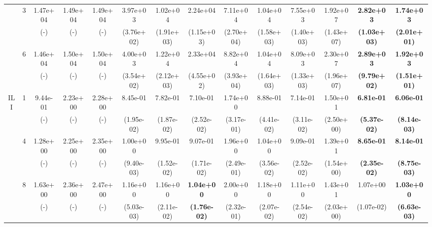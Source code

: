 \begin{table}[!t]
{\begin{tabular}{cccccccccccccc}
        \cmidrule(l){3-14}
         & \multirow{2}{*}{3}& 1.47e+04& 1.49e+04 & 1.49e+04 & 3.97e+03 & 1.02e+04& 2.24e+04& 7.11e+04 & 1.04e+04 & 7.55e+03& 1.92e+07 & \textbf{2.82e+03} & \textbf{1.74e+03}\s \\ 
         &  & (-)& (-) & (-) & (3.76e+02) & (1.91e+03)   & (1.15e+03)          & (2.70e+04) & (1.58e+03) & (1.40e+03) & (1.43e+07) & \textbf{(1.03e+03)} & \textbf{(2.01e+01)} \\
         \cmidrule(l){3-14}
         & \multirow{2}{*}{6}& 1.46e+04& 1.50e+04 & 1.50e+04 & 4.00e+03 & 1.22e+04& 2.33e+04& 8.82e+04 & 1.04e+04 & 8.09e+03& 2.30e+07 & \textbf{2.89e+03} & \textbf{1.92e+03}\s \\ 
         &  & (-)& (-) & (-) & (3.54e+02) & (2.12e+03)   & (4.55e+02)          & (3.93e+04) & (1.64e+03) & (1.33e+03) & (1.96e+07) & \textbf{(9.79e+02)} & \textbf{(1.51e+01)} \\
         \cmidrule(l){2-14}
        \multirow{6}{*}{ILI} & 1& 9.44e-01& 2.23e+00 & 2.28e+00 & 8.45e-01 & 7.82e-01& 7.10e-01& 1.74e+00 & 8.88e-01 & 7.14e-01& 1.50e+01 & \textbf{6.81e-01} & \textbf{6.06e-01}\s \\ 
        &  & (-)& (-) & (-) & (1.95e-02) & (1.87e-02)   & (2.52e-02)          & (3.17e-01) & (4.41e-02) & (3.11e-02) & (2.50e+00) & \textbf{(5.37e-02)} & \textbf{(8.14e-03)} \\
        \cmidrule(l){3-14}
         & \multirow{2}{*}{4}& 1.28e+00& 2.25e+00 & 2.35e+00 & 1.00e+00 & 9.95e-01& 9.07e-01& 1.96e+00 & 1.04e+00 & 9.09e-01& 1.39e+01 & \textbf{8.65e-01} & \textbf{8.14e-01}\s \\ 
         &  & (-)& (-) & (-) & (9.40e-03) & (1.52e-02)   & (1.71e-02)          & (2.49e-01) & (3.56e-02) & (2.52e-02) & (1.54e+00) & \textbf{(2.35e-02)} & \textbf{(8.75e-03)} \\
         \cmidrule(l){3-14}
         & \multirow{2}{*}{8}& 1.63e+00& 2.36e+00 & 2.47e+00 & 1.16e+00 & 1.16e+00& \textbf{1.04e+00} & 2.00e+00 & 1.18e+00 & 1.11e+00& 1.43e+01 & 1.07e+00& \textbf{1.03e+00}\s \\ 
         &  & (-)& (-) & (-) & (5.03e-03) & (2.11e-02)   & \textbf{(1.76e-02)} & (2.32e-01) & (2.07e-02) & (2.54e-02) & (2.03e+00) & (1.07e-02)          & \textbf{(6.63e-03)} \\
         \bottomrule
        \end{tabular}}
        \end{table}